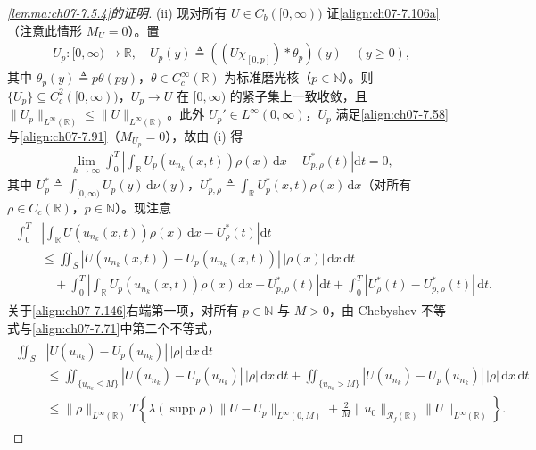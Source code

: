 \documentclass[../../main.tex]{subfiles}%
\begin{document}
\begin{proof}[\cref{lemma:ch07-7.5.4}的证明]
(ii) 现对所有 $U\in C_b([0,\infty))$ 证\eqref{align:ch07-7.106a}（注意此情形 $M_U=0$）。置
\begin{align*}
U_p:[0,\infty)\to\mathbb{R},\quad U_p(y)\triangleq ((U\chi_{[0,p]})*\theta_p)(y)\quad(y\geqslant0),
\end{align*}
其中 $\theta_p(y)\triangleq p\theta(py)$，$\theta\in C^\infty_c(\mathbb{R})$ 为标准磨光核（$p\in\mathbb{N}$）。则 $\{U_p\}\subseteq C^2_c([0,\infty))$，$U_p\to U$ 在 $[0,\infty)$ 的紧子集上一致收敛，且 $\|U_p\|_{L^\infty(\mathbb{R})}\leqslant\|U\|_{L^\infty(\mathbb{R})}$。此外 $U_p'\in L^\infty(0,\infty)$，$U_p$ 满足\eqref{align:ch07-7.58}与\eqref{align:ch07-7.91}（$M_{U_p}=0$），故由 (i) 得
\begin{align}
\lim_{k\to\infty}\int_0^T\left|\int_{\mathbb{R}}U_p(u_{n_k}(x,t))\rho(x)\,\mathrm{d}x-U_{p,\rho}^*(t)\right|\mathrm{d}t=0, \label{align:ch07-7.145}
\end{align}
其中 $U_p^*\triangleq \int_{[0,\infty)}U_p(y)\,\mathrm{d}\nu(y)$，$U_{p,\rho}^*\triangleq \int_{\mathbb{R}}U_p^*(x,t)\rho(x)\,\mathrm{d}x$（对所有 $\rho\in C_c(\mathbb{R})$，$p\in\mathbb{N}$）。现注意
\begin{align}
\begin{aligned}
\int_0^T&\left|\int_{\mathbb{R}}U(u_{n_k}(x,t))\rho(x)\,\mathrm{d}x-U_\rho^*(t)\right|\mathrm{d}t\\
&\leqslant\iint_S|U(u_{n_k}(x,t))-U_p(u_{n_k}(x,t))|\,|\rho(x)|\,\mathrm{d}x\,\mathrm{d}t\\
&\quad+\int_0^T\left|\int_{\mathbb{R}}U_p(u_{n_k}(x,t))\rho(x)\,\mathrm{d}x-U_{p,\rho}^*(t)\right|\mathrm{d}t
+\int_0^T|U_\rho^*(t)-U_{p,\rho}^*(t)|\,\mathrm{d}t.
\end{aligned} \label{align:ch07-7.146}
\end{align}
关于\eqref{align:ch07-7.146}右端第一项，对所有 $p\in\mathbb{N}$ 与 $M>0$，由 Chebyshev 不等式与\eqref{align:ch07-7.71}中第二个不等式，
\begin{align}
\begin{aligned}
\iint_S&|U(u_{n_k})-U_p(u_{n_k})|\,|\rho|\,\mathrm{d}x\,\mathrm{d}t\\
&\leqslant\iint_{\{u_{n_k}\leqslant M\}}|U(u_{n_k})-U_p(u_{n_k})|\,|\rho|\,\mathrm{d}x\,\mathrm{d}t
+\iint_{\{u_{n_k}>M\}}|U(u_{n_k})-U_p(u_{n_k})|\,|\rho|\,\mathrm{d}x\,\mathrm{d}t\\
&\leqslant\|\rho\|_{L^\infty(\mathbb{R})}T\left\{\lambda(\operatorname{supp}\rho)\|U-U_p\|_{L^\infty(0,M)}+\frac{2}{M}\|u_0\|_{\mathscr{R}_f(\mathbb{R})}\|U\|_{L^\infty(\mathbb{R})}\right\}.
\end{aligned} \label{align:ch07-7.147}

\end{align}
\end{proof}
\end{document}
